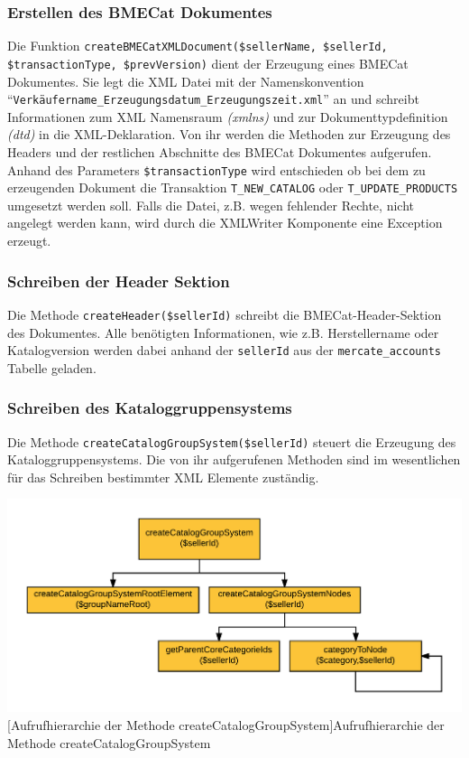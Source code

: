 	
	
	
	
	\subsubsection{Erstellen des BMECat Dokumentes}
	
	Die Funktion \texttt{createBMECatXMLDocument(\$sellerName, \$sellerId, \$transactionType, \$prevVersion)} dient der Erzeugung eines BMECat Dokumentes. Sie legt die XML Datei mit der Namenskonvention \enquote{\texttt{Verkäufername\_Erzeugungsdatum\_Erzeugungszeit.xml}} an und  schreibt Informationen zum XML Namensraum \textit{(xmlns)} und zur Dokumenttypdefinition \textit{(dtd)} in die XML-Deklaration. Von ihr werden die Methoden zur Erzeugung des Headers und der restlichen Abschnitte des BMECat Dokumentes aufgerufen.
	Anhand des Parameters \texttt{\$transactionType} wird entschieden ob bei dem zu erzeugenden Dokument die Transaktion \texttt{T\_NEW\_CATALOG} oder \texttt{T\_UPDATE\_PRODUCTS} umgesetzt werden soll. Falls die Datei, z.B. wegen fehlender Rechte, nicht angelegt werden kann, wird durch die XMLWriter Komponente eine Exception erzeugt.
	
	\subsubsection{Schreiben der Header Sektion}

	Die Methode \texttt{createHeader(\$sellerId)} schreibt die BMECat-Header-Sektion des Dokumentes. Alle benötigten Informationen, wie z.B. Herstellername oder Katalogversion werden dabei anhand der \texttt{sellerId} aus der \texttt{mercate\_accounts} Tabelle geladen.
	
	\subsubsection{Schreiben des Kataloggruppensystems}
	
	Die Methode \texttt{createCatalogGroupSystem(\$sellerId)} steuert die Erzeugung des Kataloggruppensystems. Die von ihr aufgerufenen Methoden sind im wesentlichen für das Schreiben bestimmter XML Elemente zuständig.\\
	\begin{minipage}{\linewidth}
		\vspace{1em}
		\centering
		\includegraphics[width=0.7 \linewidth]{img/CreateCatalogGroupSystemHierarchie}
		[Aufrufhierarchie der Methode createCatalogGroupSystem]{Aufrufhierarchie der Methode createCatalogGroupSystem}
		\vspace{1em}
	\end{minipage}
	

